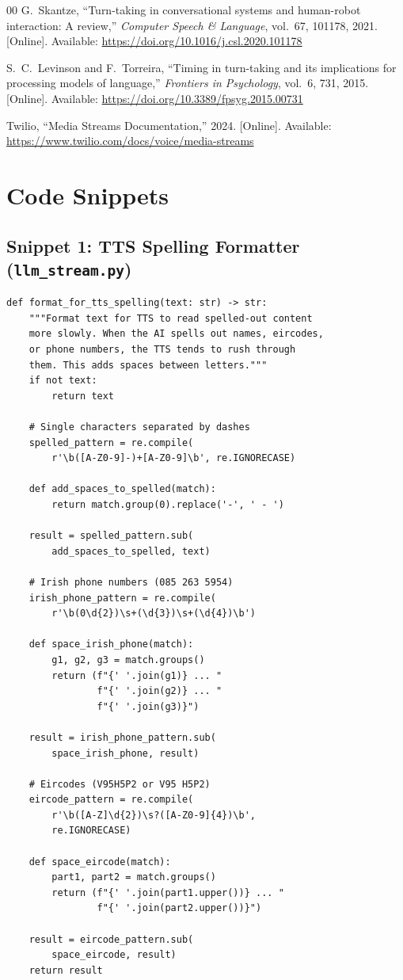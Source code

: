 \documentclass[conference]{IEEEtran}
\begin{document}
\begin{thebibliography}{00}
 G.~Skantze, ``Turn-taking in conversational systems and human-robot interaction: A review,'' \textit{Computer Speech \& Language}, vol.~67, 101178, 2021. [Online]. Available: \url{https://doi.org/10.1016/j.csl.2020.101178}

 S.~C.~Levinson and F.~Torreira, ``Timing in turn-taking and its implications for processing models of language,'' \textit{Frontiers in Psychology}, vol.~6, 731, 2015. [Online]. Available: \url{https://doi.org/10.3389/fpsyg.2015.00731}

 Twilio, ``Media Streams Documentation,'' 2024. [Online]. Available: \url{https://www.twilio.com/docs/voice/media-streams}

\end{thebibliography}


\appendices

\section{Code Snippets}

\subsection*{Snippet 1: TTS Spelling Formatter (\texttt{llm\_stream.py})}
\begin{lstlisting}[caption={TTS spelling formatter for Irish phone numbers and eircodes}]
def format_for_tts_spelling(text: str) -> str:
    """Format text for TTS to read spelled-out content
    more slowly. When the AI spells out names, eircodes,
    or phone numbers, the TTS tends to rush through
    them. This adds spaces between letters."""
    if not text:
        return text

    # Single characters separated by dashes
    spelled_pattern = re.compile(
        r'\b([A-Z0-9]-)+[A-Z0-9]\b', re.IGNORECASE)

    def add_spaces_to_spelled(match):
        return match.group(0).replace('-', ' - ')

    result = spelled_pattern.sub(
        add_spaces_to_spelled, text)

    # Irish phone numbers (085 263 5954)
    irish_phone_pattern = re.compile(
        r'\b(0\d{2})\s+(\d{3})\s+(\d{4})\b')

    def space_irish_phone(match):
        g1, g2, g3 = match.groups()
        return (f"{' '.join(g1)} ... "
                f"{' '.join(g2)} ... "
                f"{' '.join(g3)}")

    result = irish_phone_pattern.sub(
        space_irish_phone, result)

    # Eircodes (V95H5P2 or V95 H5P2)
    eircode_pattern = re.compile(
        r'\b([A-Z]\d{2})\s?([A-Z0-9]{4})\b',
        re.IGNORECASE)

    def space_eircode(match):
        part1, part2 = match.groups()
        return (f"{' '.join(part1.upper())} ... "
                f"{' '.join(part2.upper())}")

    result = eircode_pattern.sub(
        space_eircode, result)
    return result
\end{lstlisting}
\end{document}
